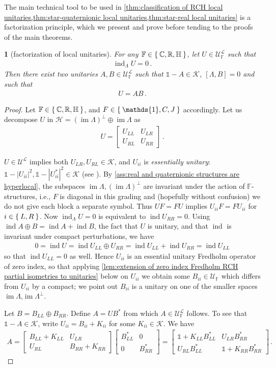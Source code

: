 \documentclass[a4paper,10pt]{article}
\numberwithin{equation}{section}
\theoremstyle{plain}
\theoremstyle{plain}
\newtheorem{lem}[thm]{\protect\lemmaname}
\theoremstyle{plain}
\theoremstyle{plain}
\theoremstyle{plain}
\theoremstyle{remark}
\theoremstyle{definition}
\theoremstyle{plain}
\providecommand{\lemmaname}{Lemma}
\newcommand{\RR}{\mathbb{R}}
\newcommand{\CC}{\mathbb{C}}
\newcommand{\FF}{\mathbb{F}}
\newcommand{\calU}{\mathcal{U}}
\newcommand{\calH}{\mathcal{H}}
\newcommand{\calK}{\mathcal{K}}
\newcommand{\calL}{\mathcal{L}}
\newcommand{\Id}{\mathds{1}}
\newcommand{\HH}{\mathbb{H}}
\newcommand{\findex}{\operatorname{ind}}
\newcommand{\im}{\operatorname{im}}
\newcommand{\eq}[1]{\begin{align*}#1\end{align*}}
\newcommand{\eql}[1]{\begin{align}#1\end{align}}
\begin{document}
	The main technical tool to be used in \cref{thm:classification of RCH local unitaries,thm:star-quaternionic local unitaries,thm:star-real local unitaries} is a factorization principle, which we present and prove before tending to the proofs of the main theorems.
	\begin{lem}[factorization of local unitaries]\label{lem:factorization for local unitaries} For any ${\FF\in\Set{\CC,\RR,\HH}}$, let $U\in\calU_\FF^\calL$ such that \eq{\findex_\Lambda U = 0\,.} Then there exist two unitaries $A,B\in\calU_\FF^\calL$ such that $\Id-A\in\calK$, $[\Lambda,B]=0$ and such that \eql{ U = AB\,.} 
	\end{lem}
	\begin{proof}
		Let $\FF\in\Set{\CC,\RR,\HH}$, and $F\in\Set{\Id,C,J}$ accordingly. Let us decompose $U$ in $\calH=(\im\Lambda)^\perp\oplus \im \Lambda $ as \eql{\label{eq:Lambda decomposition of U}U=\begin{bmatrix}U_{LL} & U_{LR} \\ U_{RL} & U_{RR}\end{bmatrix}\,.} 
		
		$U\in\calU^\calL$ implies both $U_{LR},U_{RL}\in\calK$, and $U_{ii}$ is \emph{essentially unitary}: $\Id -|U_{ii}|^2,\Id-|U_{ii}^\ast|^2\in\calK$ (see \cite{Murphy1990}). By \cref{ass:real and quaternionic structures are hyperlocal}, the subspaces $\im\Lambda,(\im\Lambda)^\perp$ are invariant under the action of $\FF$-structures, i.e., $F$ is diagonal in this grading and (hopefully without confusion) we do not give each block a separate symbol. Thus $UF=FU$ implies $U_{ii}F=FU_{ii}$ for $i\in\Set{L,R}$. Now $\findex_\Lambda U=0$ is equivalent to $\findex U_{RR}=0$.  Using $\findex A\oplus B=\findex A+\findex B$, the fact that $U$ is unitary, and that $\findex$ is invariant under compact perturbations, we have \eq{0=\findex U=\findex U_{LL}\oplus U_{RR}=\findex U_{LL} +\findex U_{RR}=\findex U_{LL}} so that $\findex U_{LL}=0$ as well. Hence $U_{ii}$ is an essential unitary Fredholm operator of zero index, so that applying \cref{lem:extension of zero index Fredholm RCH partial isometries to unitaries} below on $U_{ii}$ we obtain some $B_{ii}\in\calU_\FF$ which differs from $U_{ii}$ by a compact; we point out $B_{ii}$ is a unitary on one of the smaller spaces $\im\Lambda$,$\im\Lambda^\perp$.
		
		Let $B=B_{LL}\oplus B_{RR}$. Define $A=UB^*$ from which $A\in\calU_\FF^\calL$ follows. To see that $\Id-A\in\calK$, write $U_{ii}=B_{ii}+K_{ii}$ for some $K_{ii}\in\calK$. We have \eql{A =\begin{bmatrix}B_{LL}+K_{LL} & U_{LR} \\ U_{RL} & B_{RR}+K_{RR}\end{bmatrix}\begin{bmatrix}B_{LL}^* & 0 \\ 0 & B_{RR}^*\end{bmatrix} = \begin{bmatrix}\Id + K_{LL}B_{LL}^* & U_{LR}B^*_{RR} \\ U_{RL}B^*_{LL} & \Id + K_{RR}B^*_{RR}\end{bmatrix} \label{eq:A is compact perturbation from identity}\,.}
	\end{proof}
	
\end{document}
